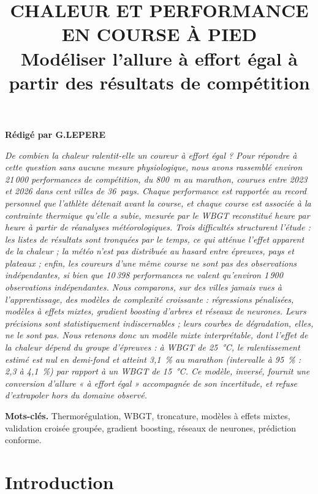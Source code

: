 \documentclass[11pt,a4paper]{article}
\title{\textbf{CHALEUR ET PERFORMANCE EN COURSE À PIED}\\[0.4em]
\large Modéliser l'allure à effort égal à partir des résultats de compétition}
\date{}
\begin{document}
\maketitle
\vspace{-3em}
\begin{center}
\textbf{Rédigé par G.LEPERE}
\end{center}
\vspace{1.5em}

{\itshape
De combien la chaleur ralentit-elle un coureur à effort égal ? Pour répondre à cette question sans aucune mesure
physiologique, nous avons rassemblé environ 21\,000 performances de compétition, du 800~m au marathon, courues entre
2023 et 2026 dans cent villes de 36~pays. Chaque performance est rapportée au record personnel que l'athlète
détenait avant la course, et chaque course est associée à la contrainte thermique qu'elle a subie, mesurée par le
WBGT reconstitué heure par heure à partir de réanalyses météorologiques. Trois difficultés structurent l'étude : les
listes de résultats sont tronquées par le temps, ce qui atténue l'effet apparent de la chaleur ; la météo n'est pas
distribuée au hasard entre épreuves, pays et plateaux ; enfin, les coureurs d'une même course ne sont pas des
observations indépendantes, si bien que 10\,398 performances ne valent qu'environ 1\,900 observations indépendantes.
Nous comparons, sur des villes jamais vues à l'apprentissage, des modèles de complexité croissante : régressions
pénalisées, modèles à effets mixtes, gradient boosting d'arbres et réseaux de neurones. Leurs précisions sont
statistiquement indiscernables ; leurs courbes de dégradation, elles, ne le sont pas. Nous retenons donc un modèle
mixte interprétable, dont l'effet de la chaleur dépend du groupe d'épreuves : à WBGT de 25~°C, le ralentissement
estimé est nul en demi-fond et atteint 3,1~\% au marathon (intervalle à 95~\% : 2,3 à 4,1~\%) par rapport
à un WBGT de 15~°C. Ce modèle, inversé, fournit une conversion d'allure « à effort égal » accompagnée de son
incertitude, et refuse d'extrapoler hors du domaine observé.\par}

\vspace{0.8em}
\textbf{Mots-clés.} Thermorégulation, WBGT, troncature, modèles à effets mixtes, validation croisée groupée,
gradient boosting, réseaux de neurones, prédiction conforme.

\newpage
\tableofcontents
\newpage

\section{Introduction}
\end{document}
